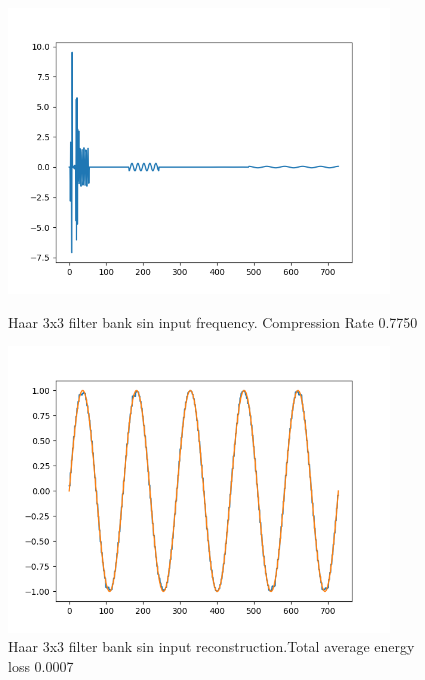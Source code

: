 \documentclass{article}
\theoremstyle{definition} %
\begin{document}
\begin{figure}[ht!]
    \centering
    \begin{minipage}{0.45\textwidth}
        \centering
        \includegraphics[width=0.9\textwidth]{fig/Haar3Augmented1D_sin_freq.png} %
        \caption{Haar 3x3 filter bank sin input frequency. Compression Rate 0.7750}
        \label{fig:Haar3_sin}
    \end{minipage}\hfill
    \begin{minipage}{0.45\textwidth}
        \centering
        \includegraphics[width=0.9\textwidth]{fig/Haar3Augmented1D_sin_rec.png} %
        \caption{Haar 3x3 filter bank sin input reconstruction.Total average energy loss 0.0007}
    \end{minipage}
\end{figure}
\end{document}
